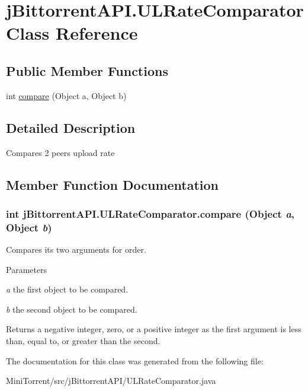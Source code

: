\hypertarget{classj_bittorrent_a_p_i_1_1_u_l_rate_comparator}{
\section{jBittorrentAPI.ULRateComparator Class Reference}
\label{classj_bittorrent_a_p_i_1_1_u_l_rate_comparator}
}
\subsection*{Public Member Functions}
\begin{DoxyCompactItemize}
\item 
int \hyperlink{classj_bittorrent_a_p_i_1_1_u_l_rate_comparator_a36b144422c505a914fd0c40b22213d2b}{compare} (Object a, Object b)
\end{DoxyCompactItemize}


\subsection{Detailed Description}
Compares 2 peers upload rate 

\subsection{Member Function Documentation}
\hypertarget{classj_bittorrent_a_p_i_1_1_u_l_rate_comparator_a36b144422c505a914fd0c40b22213d2b}{
\subsubsection[{compare}]{\setlength{\rightskip}{0pt plus 5cm}int jBittorrentAPI.ULRateComparator.compare (Object {\em a}, \/  Object {\em b})}}
\label{classj_bittorrent_a_p_i_1_1_u_l_rate_comparator_a36b144422c505a914fd0c40b22213d2b}
Compares its two arguments for order.


\begin{DoxyParams}{Parameters}
\item[{\em a}]the first object to be compared. \item[{\em b}]the second object to be compared. \end{DoxyParams}
\begin{DoxyReturn}{Returns}
a negative integer, zero, or a positive integer as the first argument is less than, equal to, or greater than the second. 
\end{DoxyReturn}


The documentation for this class was generated from the following file:\begin{DoxyCompactItemize}
\item 
MiniTorrent/src/jBittorrentAPI/ULRateComparator.java\end{DoxyCompactItemize}

